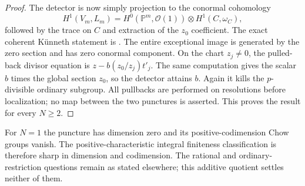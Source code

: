 \begin{proof}
The detector is now simply projection to the conormal cohomology
\[
 H^1(V_m,L_m)
       =H^0(\mathbb P^m,\mathcal O(1))\otimes H^1(C,\omega_C),
\]
followed by the trace on $C$ and extraction of the $z_0$ coefficient.
The exact coherent K\"unneth statement is
\citet[Lemma~33.29.1]{D_StacksSegreCohomology}.
The entire exceptional image is generated by the zero section and
has zero conormal component. On the chart $z_j\ne0$, the pulled-back
divisor equation is $z-b(z_0/z_j)t'_j$. The same computation gives
the scalar $b$ times the global section $z_0$, so the detector
attains $b$. Again it kills the $p$-divisible ordinary subgroup.
All pullbacks are performed on resolutions before localization;
no map between the two punctures is asserted.
This proves the result for every $N\ge2$.
\end{proof}

For $N=1$ the puncture has dimension zero and its positive-codimension
Chow groups vanish. The positive-characteristic integral finiteness
classification is therefore sharp in dimension and codimension.
The rational and ordinary-restriction questions remain as stated
elsewhere; this additive quotient settles neither of them.
